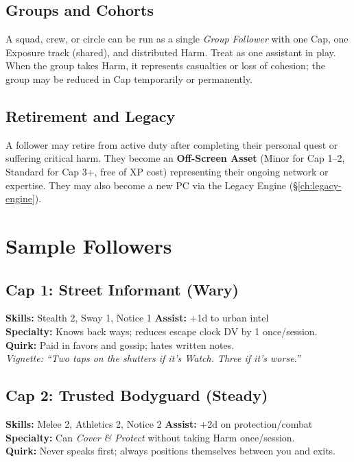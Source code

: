 \subsection*{Groups and Cohorts}
A squad, crew, or circle can be run as a single \emph{Group Follower} with one Cap, one Exposure track (shared), and distributed Harm. Treat as one assistant in play. When the group takes Harm, it represents casualties or loss of cohesion; the group may be reduced in Cap temporarily or permanently.

\subsection*{Retirement and Legacy}
A follower may retire from active duty after completing their personal quest or suffering critical harm. They become an \textbf{Off-Screen Asset} (Minor for Cap 1–2, Standard for Cap 3+, free of XP cost) representing their ongoing network or expertise. They may also become a new PC via the Legacy Engine (\S\ref{ch:legacy-engine}).

\section{Sample Followers}

\subsection*{Cap 1: Street Informant (Wary)}
\textbf{Skills:} Stealth 2, Sway 1, Notice 1 \quad
\textbf{Assist:} +1d to urban intel \\
\textbf{Specialty:} Knows back ways; reduces escape clock DV by 1 once/session. \\
\textbf{Quirk:} Paid in favors and gossip; hates written notes. \\
\emph{Vignette:} \textit{``Two taps on the shutters if it's Watch. Three if it's worse.''}

\subsection*{Cap 2: Trusted Bodyguard (Steady)}
\textbf{Skills:} Melee 2, Athletics 2, Notice 2 \quad
\textbf{Assist:} +2d on protection/combat \\
\textbf{Specialty:} Can \emph{Cover \& Protect} without taking Harm once/session. \\
\textbf{Quirk:} Never speaks first; always positions themselves between you and exits.


